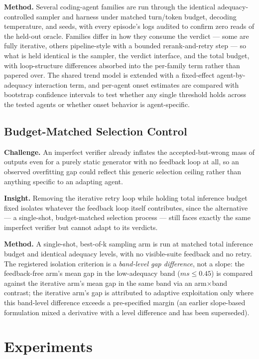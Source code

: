 \documentclass[11pt]{article}
\begin{document}
\textbf{Method.} Several coding-agent families are run through the identical adequacy-controlled sampler and harness under matched turn/token budget, decoding temperature, and seeds, with every episode's logs audited to confirm zero reads of the held-out oracle. Families differ in how they consume the verdict --- some are fully iterative, others pipeline-style with a bounded rerank-and-retry step --- so what is held identical is the sampler, the verdict interface, and the total budget, with loop-structure differences absorbed into the per-family term rather than papered over. The shared trend model is extended with a fixed-effect agent-by-adequacy interaction term, and per-agent onset estimates are compared with bootstrap confidence intervals to test whether any single threshold holds across the tested agents or whether onset behavior is agent-specific.

\subsection{Budget-Matched Selection Control}
\textbf{Challenge.} An imperfect verifier already inflates the accepted-but-wrong mass of outputs even for a purely static generator with no feedback loop at all, so an observed overfitting gap could reflect this generic selection ceiling rather than anything specific to an adapting agent.

\textbf{Insight.} Removing the iterative retry loop while holding total inference budget fixed isolates whatever the feedback loop itself contributes, since the alternative --- a single-shot, budget-matched selection process --- still faces exactly the same imperfect verifier but cannot adapt to its verdicts.

\textbf{Method.} A single-shot, best-of-k sampling arm is run at matched total inference budget and identical adequacy levels, with no visible-suite feedback and no retry. The registered isolation criterion is a \emph{band-level gap difference}, not a slope: the feedback-free arm's mean gap in the low-adequacy band ($ms \le 0.45$) is compared against the iterative arm's mean gap in the same band via an arm$\times$band contrast; the iterative arm's gap is attributed to adaptive exploitation only where this band-level difference exceeds a pre-specified margin (an earlier slope-based formulation mixed a derivative with a level difference and has been superseded).

\section{Experiments}
\end{document}
